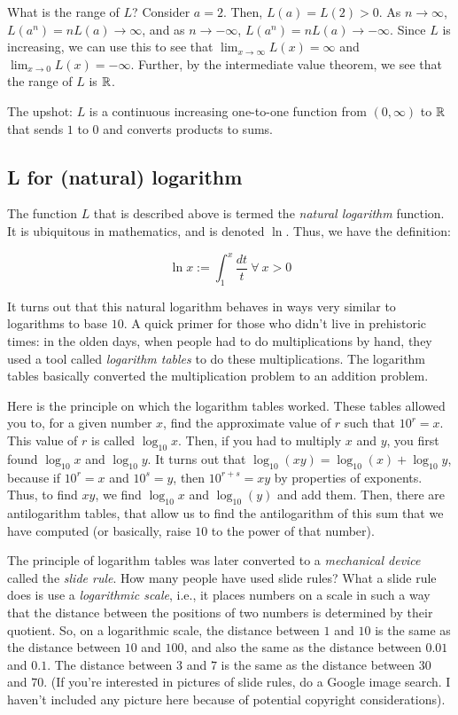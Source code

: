 \documentclass[10pt]{amsart}
\begin{document}
What is the range of $L$? Consider $a = 2$. Then, $L(a) = L(2) >
0$. As $n \to \infty$, $L(a^n) = nL(a) \to \infty$, and as $n \to
-\infty$, $L(a^n) = nL(a) \to -\infty$. Since $L$ is increasing, we
can use this to see that $\lim_{x \to \infty} L(x) = \infty$ and
$\lim_{x \to 0} L(x) = -\infty$. Further, by the intermediate value
theorem, we see that the range of $L$ is $\mathbb{R}$. 

The upshot: $L$ is a continuous increasing one-to-one function from
$(0,\infty)$ to $\mathbb{R}$ that sends $1$ to $0$ and converts products to
sums.

\subsection{L for (natural) logarithm}

The function $L$ that is described above is termed the {\em natural
logarithm} function. It is ubiquitous in mathematics, and is denoted
$\ln$. Thus, we have the definition:

$$\ln x := \int_1^x \frac{dt}{t} \ \forall \ x > 0$$

It turns out that this natural logarithm behaves in ways very similar
to logarithms to base $10$. A quick primer for those who didn't live
in prehistoric times: in the olden days, when people had to do
multiplications by hand, they used a tool called {\em logarithm
tables} to do these multiplications. The logarithm tables basically
converted the multiplication problem to an addition problem.

Here is the principle on which the logarithm tables worked. These
tables allowed you to, for a given number $x$, find the approximate
value of $r$ such that $10^r = x$. This value of $r$ is called
$\log_{10}x$. Then, if you had to multiply $x$ and $y$, you first
found $\log_{10}x$ and $\log_{10}y$. It turns out that $\log_{10}(xy)
= \log_{10}(x) + \log_{10}y$, because if $10^r = x$ and $10^s = y$,
then $10^{r + s} = xy$ by properties of exponents. Thus, to find $xy$,
we find $\log_{10}x$ and $\log_{10}(y)$ and add them. Then, there are
antilogarithm tables, that allow us to find the antilogarithm of this
sum that we have computed (or basically, raise $10$ to the power of
that number).

The principle of logarithm tables was later converted to a {\em
mechanical device} called the {\em slide rule}. How many people have
used slide rules? What a slide rule does is use a {\em logarithmic
scale}, i.e., it places numbers on a scale in such a way that the
distance between the positions of two numbers is determined by their
quotient. So, on a logarithmic scale, the distance between $1$ and
$10$ is the same as the distance between $10$ and $100$, and also the
same as the distance between $0.01$ and $0.1$. The distance between
$3$ and $7$ is the same as the distance between $30$ and $70$. (If
you're interested in pictures of slide rules, do a Google image
search. I haven't included any picture here because of potential
copyright considerations).
\end{document}
